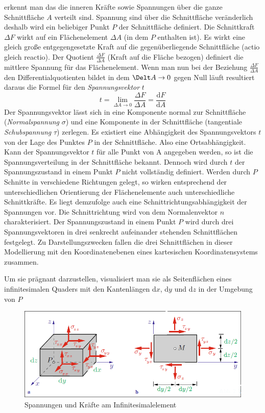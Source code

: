\documentclass[12pt,a4paper,parskip,twoside,BCOR5mm,headsepline]{scrartcl}
\begin{document}
\begin{description*}
  
   erkennt man das die inneren Kräfte sowie Spannungen über die ganze Schnittfläche $ A $ verteilt sind. Spannung sind über die Schnittfläche veränderlich deshalb  wird ein beliebiger Punkt $ P $ der Schnittfläche definiert. Die Schnittkraft $ \Delta F $  wirkt auf ein Flächenelement $ \Delta A $ (in dem $ P $ enthalten ist). Es wirkt eine gleich große entgegengesetzte Kraft auf die gegenüberliegende Schnittfläche (actio gleich reactio). Der Quotient $ \frac{\Delta F}{\Delta A} $ (Kraft auf die Fläche bezogen) definiert die mittlere Spannung für das Flächenelement. Wenn man nun bei der Beziehung $ \frac{\Delta F}{\Delta A} $ den Differentialquotienten bildet in dem $ \Delt A \rightarrow 0 $ gegen Null läuft  resultiert daraus die Formel für den \emph{Spannungsvektor }$ t $ \begin{equation}
   t = \lim \limits_{\Delta A \to 0} \frac{\Delta F}{\Delta A} = \frac{\text{d}F}{\text{d}A}  
   \end{equation}
Der Spannungsvektor lässt sich in eine Komponente normal zur Schnittfläche (\emph{Normalspannung} $ \sigma $) und eine Komponente in der Schnittfläche (tangentiale \emph{Schubspannung} $ \tau $) zerlegen. Es existiert eine Abhängigkeit des Spannungsvektors $ t $ von der Lage des Punktes $ P $ in der Schnittfläche. Also eine Ortsabhängigkeit. Kann der Spannungsvektor $ t $ für alle Punkt von A angegeben werden, so ist die Spannungsverteilung in der Schnittfläche bekannt. Dennoch wird durch $ t $ der Spannungszustand in einem Punkt $ P $ nicht vollständig definiert. Werden durch $ P $ Schnitte in verschiedene Richtungen gelegt, so wirken entsprechend der unterschiedlichen Orientierung der Flächenelemente auch unterschiedliche Schnittkräfte. Es liegt demzufolge auch eine Schnittrichtungsabhängigkeit der Spannungen vor. Die Schnittrichtung wird von dem Normalenvektor $ n $ charakterisiert. Der Spannungszustand in einem Punkt $ P $ wird durch drei Spannungsvektoren in drei senkrecht aufeinander stehenden Schnittflächen festgelegt. Zu Darstellungszwecken fallen die drei Schnittflächen in dieser Modellierung mit den Koordinatenebenen eines kartesischen Koordinatensystems zusammen.

Um sie prägnant darzustellen, visualisiert man sie als Seitenflächen eines infinitesimalen Quaders mit den Kantenlängen d$ x $, d$ y $ und d$ z $ in der Umgebung von $ P $
\begin{figure}
  \centering
  \includegraphics[width=.8\textwidth]{tensor}
  \caption[Spannungen und Kräfte am Infinitesimalelement]{Spannungen und Kräfte am Infinitesimalelement \autocite[44]{tmr}}
  \label{fig:tensor}
  \end{figure}
 

\end{description*}
\end{document}
